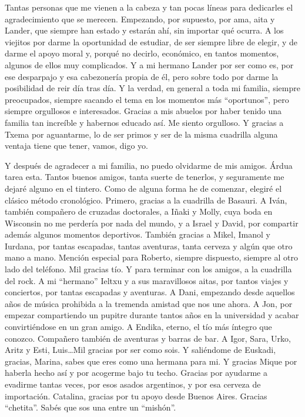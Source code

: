 
\begin{acknowledgementslong} 

Tantas personas que me vienen a la cabeza y tan pocas líneas para dedicarles
el agradecimiento que se merecen. Empezando, por supuesto, por ama, aita y Lander,
que siempre han estado y estarán ahí, sin importar qué ocurra. A los viejitos
por darme la oportunidad de estudiar, de ser siempre libre de elegir, y de darme
el apoyo moral y, porqué no decirlo, económico, en tantos momentos, algunos de
ellos muy complicados. Y a mi hermano Lander por ser como es, por ese desparpajo
y esa cabezonería propia de él, pero sobre todo por darme la posibilidad de reir
día tras día. Y la verdad, en general a toda mi familia, siempre preocupados,
siempre sacando el tema en los momentos más ``oportunos'', pero siempre orgullosos
e interesados. Gracias a mis abuelos por haber tenido una familia tan increíble
y habernos educado así. Me siento orgulloso. Y gracias a Txema por aguantarme,
lo de ser primos y ser de la misma cuadrilla alguna ventaja tiene que tener,
vamos, digo yo.

Y después de agradecer a mi familia, no puedo olvidarme de mis amigos. Árdua
tarea esta. Tantos buenos amigos, tanta suerte de tenerlos, y seguramente me
dejaré alguno en el tintero. Como de alguna forma he de comenzar, elegiré el
clásico método cronológico. Primero, gracias a la cuadrilla de Basauri. A Iván,
también compañero de cruzadas doctorales, a Iñaki y Molly, cuya boda en Wisconsin
no me perdería por nada del mundo, y a Israel y David, por compartir además algunos
momentos deportivos. También gracias a Mikel, Imanol y Iurdana, por tantas
escapadas, tantas aventuras, tanta cerveza y algún que otro mano a mano. Mención
especial para Roberto, siempre dispuesto, siempre al otro lado del teléfono. Mil
gracias tío. Y para
terminar con los amigos, a la cuadrilla del rock. A mi ``hermano'' Ieltxu y a sus
maravillosos aitas, por tantos viajes y conciertos, por tantas escapadas y aventuras.
A Dani, empezando desde aquellos años de música prohibida a la tremenda amistad
que nos une ahora. A Jon, por empezar compartiendo un pupitre durante tantos años
en la universidad y acabar convirtiéndose en un gran amigo. A Endika, eterno, el
tío más íntegro que conozco. Compañero también de aventuras y barras de bar. A Igor,
Sara, Urko, Aritz y Esti, Luis\dots Mil gracias por ser como sois. Y saliéndome
de Euskadi, gracias, Marina, sabes que eres como una hermana
para mi. Y gracias Mique por haberla hecho así y por acogerme bajo tu techo. 
Gracias por ayudarme a evadirme tantas veces, por esos asados argentinos, y por 
esa cerveza de importación. Catalina, gracias por tu apoyo desde Buenos Aires. 
Gracias ``chetita''. Sabés que sos una entre un ``mishón''.


\end{acknowledgementslong}

